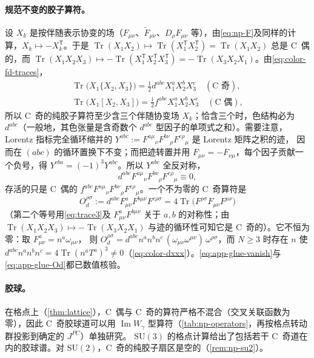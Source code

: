 \documentclass[UTF8,a4paper,11pt,fontset=fandol]{ctexart}
\theoremstyle{cplain}
\theoremstyle{cdefinition}
\theoremstyle{cremark}
\numberwithin{equation}{section}
\DeclareMathOperator{\Tr}{Tr}
\DeclareMathOperator{\Imag}{Im}
\newcommand{\tp}{\mathsf{T}}                         %
\newcommand{\ii}{\mathrm{i}}                        %
\begin{document}
\paragraph{规范不变的胶子算符。}设 $X_k$ 是按伴随表示协变的场（$F_{\mu\nu}$、$\tilde F_{\mu\nu}$、$D_\rho F_{\mu\nu}$ 等），由\cref{eq:np-F}及同样的计算，$X_k\mapsto-X_k^{\tp}$。于是
$\Tr(X_1X_2)\mapsto\Tr(X_1^{\tp}X_2^{\tp})=\Tr(X_1X_2)$ 总是 C~偶的，而 $\Tr(X_1X_2X_3)\mapsto-\Tr(X_1^{\tp}X_2^{\tp}X_3^{\tp})=-\Tr(X_3X_2X_1)$。由\cref{eq:color-fd-traces}，
\begin{equation}\label{eq:app-glue-ops}
\begin{gathered}
\Tr\bigl(X_1\{X_2,X_3\}\bigr)=\tfrac12d^{abc}X_1^aX_2^bX_3^c\quad(\text{C~奇}),\\
\Tr\bigl(X_1[X_2,X_3]\bigr)=\tfrac{\ii}{2}f^{abc}X_1^aX_2^bX_3^c\quad(\text{C~偶}),
\end{gathered}
\end{equation}
所以 C~奇的纯胶子算符至少含三个伴随协变场 $X_k$；恰含三个时，色结构必为 $d^{abc}$（一般地，其色张量是含奇数个 $d^{abc}$ 型因子的单项式之和）。需要注意，Lorentz 指标完全循环缩并的 $Y^{abc}:=F^{a\mu}{}_\nu F^{b\nu}{}_\rho F^{c\rho}{}_\mu$ 是 Lorentz 矩阵之积的迹，
因而在 $(abc)$ 的循环置换下不变；而把迹转置并用 $F_{\mu\nu}=-F_{\nu\mu}$，每个因子贡献一个负号，得 $Y^{cba}=(-1)^3Y^{abc}$。所以 $Y^{abc}$ 全反对称，
\begin{equation}\label{eq:app-glue-vanish}
d^{abc}F^{a\mu}{}_\nu F^{b\nu}{}_\rho F^{c\rho}{}_\mu\equiv0 ,
\end{equation}
存活的只是 C~偶的 $f^{abc}F^{a\mu}{}_\nu F^{b\nu}{}_\rho F^{c\rho}{}_\mu$。一个不为零的 C~奇算符是
\begin{equation}\label{eq:app-glue-Od}
O_d^{\rho\sigma}:=d^{abc}F^a_{\mu\nu}F^{b\mu\nu}F^{c\rho\sigma}=4\Tr\bigl(F^{\rho\sigma}F_{\mu\nu}F^{\mu\nu}\bigr)
\end{equation}
（第二个等号用\cref{eq:trace3}及 $F^a_{\mu\nu}F^{b\mu\nu}$ 关于 $a,b$ 的对称性；由 $\Tr(X_1X_2X_3)\mapsto-\Tr(X_3X_2X_1)$ 与迹的循环性可知它是 C~奇的）。它不恒为零：取 $F^a_{\mu\nu}=n^a\omega_{\mu\nu}$，
则 $O_d^{\rho\sigma}=d^{abc}n^an^bn^c\,(\omega_{\mu\nu}\omega^{\mu\nu})\,\omega^{\rho\sigma}$，而 $N\ge3$ 时存在 $n$ 使 $d^{abc}n^an^bn^c=4\Tr(n^aT^a)^3\neq0$（\cref{eq:color-dxxx}）。\cref{eq:app-glue-vanish}与\cref{eq:app-glue-Od}都已数值核验。

\paragraph{胶球。}在格点上（\cref{thm:lattice}），C~偶与 C~奇的算符严格不混合（交叉关联函数为零），因此 C~奇胶球道可以用 $\Imag W_\gamma$ 型算符（\cref{tab:np-operators}，再按格点转动群投影到确定的 $J^{PC}$）单独研究。
$\mathrm{SU}(3)$ 的格点计算给出了包括若干 C~奇道在内的胶球谱\cite{MorningstarPeardon1999}。对 $\mathrm{SU}(2)$，C~奇的纯胶子扇区是空的（\cref{rem:np-su2}）。
\end{document}
